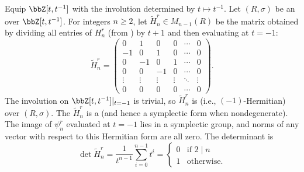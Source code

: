 \begin{proposition}[Skew-symmetric matrix for the reduced Burau representation at $t = -1$] \label{proposition:skew_symmetric_matrix_for_reduced_burau_at_minus_one}
    Equip $\bbZ[t,t^{-1}]$ with the involution determined by $t \mapsto t^{-1}$. Let $(R,\sigma)$ be an  over $\bbZ[t,t^{-1}]$.
    For integers $n \geq 2$, let $\tilde{H}_n^r \in M_{n-1}(R)$ be the matrix obtained by dividing all entries of $H_n^r$ (from ) by $t+1$ and then evaluating at $t = -1$:
    \begin{equation} \label{eq:skew_symmetric_matrix_for_reduced_burau_at_minus_one}
    \tilde{H}_n^r = \begin{pmatrix}
        0 & 1 & 0 & 0 & \cdots & 0 \\
        -1 & 0 & 1 & 0 & \cdots & 0 \\
        0 & -1 & 0 & 1 & \cdots & 0 \\
        0 & 0 &  -1 & 0 & \cdots & 0 \\
        \vdots & \vdots & \vdots & \vdots & \ddots & \vdots \\
        0 & 0 & 0 & 0 & \cdots & 0
    \end{pmatrix}.
    \end{equation}
    The involution on $\bbZ[t,t^{-1}]|_{t = -1}$ is trivial, so $\tilde{H}_n^r$ is  (i.e., $(-1)$-Hermitian) over $(R,\sigma)$. The  $\tilde{H}_n^r$ is a  (and hence a symplectic form when nondegenerate). The image of $\psi_n^r$ evaluated at $t = -1$ lies in a symplectic group, and norms of any vector with respect to this Hermitian form are all zero. The determinant is
    \begin{equation} \label{eq:determinant_of_tilde_H_n_r}
        \det \tilde{H}_n^r = \frac{1}{t^{n-1}} \sum_{i=0}^{n-1} t^i = \begin{cases} 0 &\text{if } 2 \mid n \\ 1 &\text{otherwise}. \end{cases}
    \end{equation}
\end{proposition}